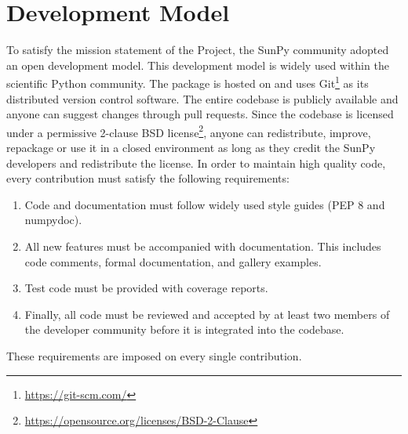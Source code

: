 \section{Development Model}
\label{sec:development}

To satisfy the mission statement of the Project, the SunPy community adopted an open development model.
This development model is widely used within the scientific Python community.
The \sunpypkg package is hosted on \github and uses Git\footnote{\url{https://git-scm.com/}} as its distributed version control software.
The entire codebase is publicly available and anyone can suggest changes through pull requests.
Since the codebase is licensed under a permissive 2-clause BSD license\footnote{\url{https://opensource.org/licenses/BSD-2-Clause}}, anyone can redistribute, improve, repackage or use it in a closed environment as long as they credit the SunPy developers and redistribute the license.
In order to maintain high quality code, every contribution must satisfy the following requirements:
\begin{enumerate}
    \item Code and documentation must follow widely used style guides (PEP 8 and numpydoc).
    \item All new features must be accompanied with documentation.
    This includes code comments, formal documentation, and gallery examples.
    \item Test code must be provided with coverage reports.
    \item Finally, all code must be reviewed and accepted by at least two members of the developer community before it is integrated into the codebase.
\end{enumerate}
These requirements are imposed on every single contribution.

